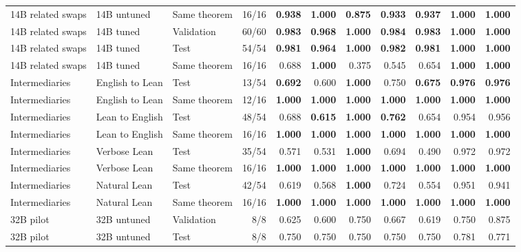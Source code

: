 \begin{table}[htbp]
\begin{adjustbox}{max width=\textwidth}
\begin{tabular}{lllrrrrrrrr}
14B related swaps & 14B untuned & Same theorem & 16/16 & \textbf{0.938} & \textbf{1.000} & \textbf{0.875} & \textbf{0.933} & \textbf{0.937} & \textbf{1.000} & \textbf{1.000} \\
14B related swaps & 14B tuned & Validation & 60/60 & \textbf{0.983} & \textbf{0.968} & \textbf{1.000} & \textbf{0.984} & \textbf{0.983} & \textbf{1.000} & \textbf{1.000} \\
14B related swaps & 14B tuned & Test & 54/54 & \textbf{0.981} & \textbf{0.964} & \textbf{1.000} & \textbf{0.982} & \textbf{0.981} & \textbf{1.000} & \textbf{1.000} \\
14B related swaps & 14B tuned & Same theorem & 16/16 & 0.688 & \textbf{1.000} & 0.375 & 0.545 & 0.654 & \textbf{1.000} & \textbf{1.000} \\
\midrule
Intermediaries & English to Lean & Test & 13/54 & \textbf{0.692} & 0.600 & \textbf{1.000} & 0.750 & \textbf{0.675} & \textbf{0.976} & \textbf{0.976} \\
Intermediaries & English to Lean & Same theorem & 12/16 & \textbf{1.000} & \textbf{1.000} & \textbf{1.000} & \textbf{1.000} & \textbf{1.000} & \textbf{1.000} & \textbf{1.000} \\
Intermediaries & Lean to English & Test & 48/54 & 0.688 & \textbf{0.615} & \textbf{1.000} & \textbf{0.762} & 0.654 & 0.954 & 0.956 \\
Intermediaries & Lean to English & Same theorem & 16/16 & \textbf{1.000} & \textbf{1.000} & \textbf{1.000} & \textbf{1.000} & \textbf{1.000} & \textbf{1.000} & \textbf{1.000} \\
Intermediaries & Verbose Lean & Test & 35/54 & 0.571 & 0.531 & \textbf{1.000} & 0.694 & 0.490 & 0.972 & 0.972 \\
Intermediaries & Verbose Lean & Same theorem & 16/16 & \textbf{1.000} & \textbf{1.000} & \textbf{1.000} & \textbf{1.000} & \textbf{1.000} & \textbf{1.000} & \textbf{1.000} \\
Intermediaries & Natural Lean & Test & 42/54 & 0.619 & 0.568 & \textbf{1.000} & 0.724 & 0.554 & 0.951 & 0.941 \\
Intermediaries & Natural Lean & Same theorem & 16/16 & \textbf{1.000} & \textbf{1.000} & \textbf{1.000} & \textbf{1.000} & \textbf{1.000} & \textbf{1.000} & \textbf{1.000} \\
\midrule
32B pilot & 32B untuned & Validation & 8/8 & 0.625 & 0.600 & 0.750 & 0.667 & 0.619 & 0.750 & 0.875 \\
32B pilot & 32B untuned & Test & 8/8 & 0.750 & 0.750 & 0.750 & 0.750 & 0.750 & 0.781 & 0.771 \\

\end{tabular}
\end{adjustbox}
\end{table}
